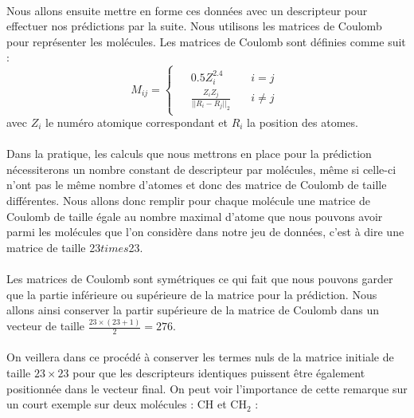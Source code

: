 \documentclass[a4paper,12pt,titlepage]{report}
\begin{document}
\paragraph{}
Nous allons ensuite mettre en forme ces données avec un descripteur pour effectuer nos prédictions par la suite. Nous utilisons les matrices de Coulomb pour représenter les molécules.
Les matrices de Coulomb sont définies comme suit : 
\[
M_{ij} = 
	\left\{
	\begin{array}{ccc}		
	\begin{aligned}
		& 0.5 Z_{i}^{2.4} \quad &i=j\\
		& \frac{Z_i Z_j}{||R_i - R_j||_{2}} \quad &i\neq j
	\end{aligned}
\end{array}
	\right.
\]
avec $Z_i$ le numéro atomique correspondant et $R_i$ la position des atomes.\\


\paragraph{}
Dans la pratique, les calculs que nous mettrons en place pour la prédiction nécessiterons un nombre constant de descripteur par molécules, même si celle-ci n'ont pas le même nombre d'atomes et donc des matrice de Coulomb de taille différentes.
Nous allons donc remplir pour chaque molécule une matrice de Coulomb de taille égale au nombre maximal d'atome que nous pouvons avoir parmi les molécules que l'on considère dans notre jeu de données, c'est à dire une matrice de taille 23$times$23.

\paragraph{}
Les matrices de Coulomb sont symétriques ce qui fait que nous pouvons garder que la partie inférieure ou supérieure de la matrice pour la prédiction. Nous allons ainsi conserver la partir supérieure de la matrice de Coulomb dans un vecteur de taille $\frac{23\times(23+1)}{2} = 276$.

\paragraph{}
On veillera dans ce procédé à conserver les termes nuls de la matrice initiale de taille $23\times23$ pour que les descripteurs identiques puissent être également positionnée dans le vecteur final. On peut voir l'importance de cette remarque sur  un court exemple sur deux molécules : CH et CH$_2$ :
\end{document}
